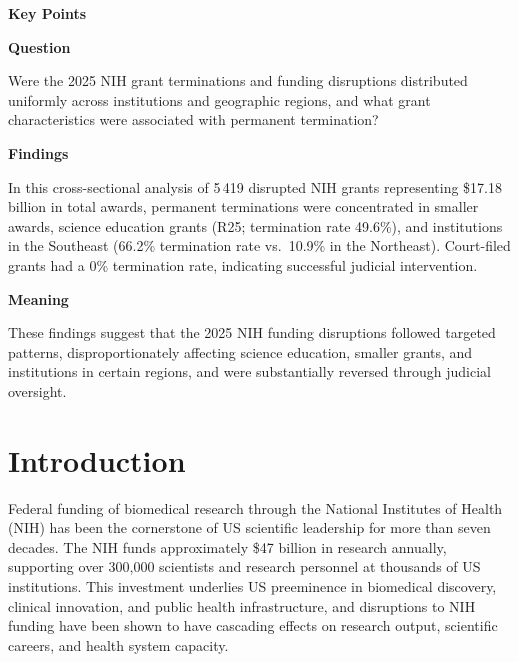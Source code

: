 \documentclass[10pt, letterpaper]{article}
\begin{document}
\begin{minipage}[t]{0.33\textwidth}
\begin{mdframed}[style=keypointsbox]
{\sffamily\bfseries\fontsize{10}{12}\selectfont\color{jamacrimson}
Key Points\par}
\vspace{4pt}

{\sffamily\bfseries\fontsize{8.5}{10.5}\selectfont Question\enspace}%
{\fontsize{8.5}{10.5}\selectfont
Were the 2025 NIH grant terminations and funding disruptions distributed uniformly across institutions and geographic regions, and what grant characteristics were associated with permanent termination?\par}

\vspace{6pt}

{\sffamily\bfseries\fontsize{8.5}{10.5}\selectfont Findings\enspace}%
{\fontsize{8.5}{10.5}\selectfont
In this cross-sectional analysis of 5\,419 disrupted NIH grants representing \$17.18 billion in total awards, permanent terminations were concentrated in smaller awards, science education grants (R25; termination rate 49.6\%), and institutions in the Southeast (66.2\% termination rate vs.\ 10.9\% in the Northeast). Court-filed grants had a 0\% termination rate, indicating successful judicial intervention.\par}

\vspace{6pt}

{\sffamily\bfseries\fontsize{8.5}{10.5}\selectfont Meaning\enspace}%
{\fontsize{8.5}{10.5}\selectfont
These findings suggest that the 2025 NIH funding disruptions followed targeted patterns, disproportionately affecting science education, smaller grants, and institutions in certain regions, and were substantially reversed through judicial oversight.\par}
\end{mdframed}
\end{minipage}

\newpage

\section*{Introduction}

Federal funding of biomedical research through the National Institutes of Health (NIH) has been the cornerstone of US scientific leadership for more than seven decades.\cite{moses2015financ,ginsburg2018us} The NIH funds approximately \$47 billion in research annually, supporting over 300,000 scientists and research personnel at thousands of US institutions.\cite{nih2024budget} This investment underlies US preeminence in biomedical discovery, clinical innovation, and public health infrastructure, and disruptions to NIH funding have been shown to have cascading effects on research output, scientific careers, and health system capacity.\cite{jones2023nih,blume2018funding}
\end{document}
